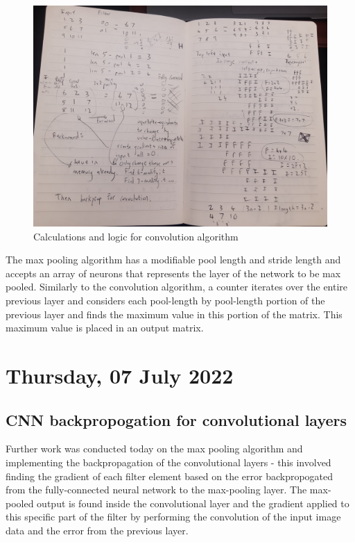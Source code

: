\begin{figure}[h]
    \centering
    \includegraphics[width=1.0\linewidth]{figures/conv_maths_labbook.jpg}
    \caption{Calculations and logic for convolution algorithm}
    \label{fig:conv_maths_labbook}
\end{figure}

The max pooling algorithm has a modifiable pool length and stride length and accepts an array of neurons that represents the layer of the network to be max pooled. Similarly to the convolution algorithm, a counter iterates over the entire previous layer and considers each pool-length by pool-length portion of the previous layer and finds the maximum value in this portion of the matrix. This maximum value is placed in an output matrix.

\section[2022/07/07]{Thursday, 07 July 2022}

\subsection{CNN backpropogation for convolutional layers}

Further work was conducted today on the max pooling algorithm and implementing the backpropagation of the convolutional layers - this involved finding the gradient of each filter element based on the error backpropogated from the fully-connected neural network to the max-pooling layer. The max-pooled output is found inside the convolutional layer and the gradient applied to this specific part of the filter by performing the convolution of the input image data and the error from the previous layer. 

